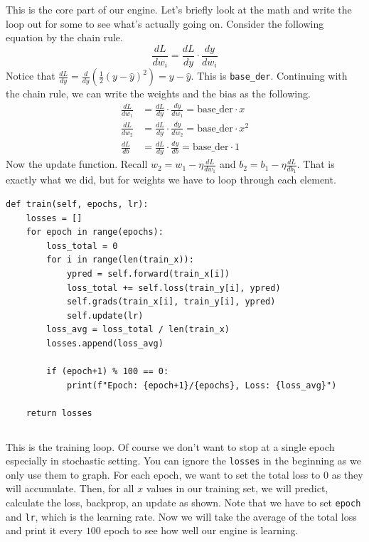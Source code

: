 \documentclass[../../main.tex]{subfiles}
\begin{document}
This is the core part of our engine. Let's briefly look at the math
and write the loop out for some to see what's actually going on.
Consider the following equation by the chain rule.
\[
\frac{dL}{dw_i} = \frac{dL}{dy} \cdot \frac{dy}{dw_i}
\]
Notice that $\frac{dL}{dy} = \frac{d}{dy} (\frac{1}{2} (y -
\hat{y})^2) = y - \hat{y}$. This is \verb|base_der|. Continuing with
the chain rule, we can write the weights and the bias as the
following.
\begin{align*}
    \frac{dL}{dw_1}
    &= \frac{dL}{dy} \cdot \frac{dy}{dw_1}
    = \text{base\_der} \cdot x \\
    \frac{dL}{dw_2}
    &= \frac{dL}{dy} \cdot \frac{dy}{dw_2}
    = \text{base\_der} \cdot x^2 \\
    \frac{dL}{db}
    &= \frac{dL}{dy} \cdot \frac{dy}{db}
    = \text{base\_der} \cdot 1
\end{align*}
Now the update function. Recall $w_2 = w_1 - \eta \frac{dL}{dw_1}$
and $b_2 = b_1 - \eta \frac{dL}{db_1}$. That is exactly what we did,
but for weights we have to loop through each element.

\begin{jupyter}
\begin{lstlisting}[style=jin]
def train(self, epochs, lr):
    losses = []
    for epoch in range(epochs):
        loss_total = 0
        for i in range(len(train_x)):
            ypred = self.forward(train_x[i])
            loss_total += self.loss(train_y[i], ypred)
            self.grads(train_x[i], train_y[i], ypred)
            self.update(lr)
        loss_avg = loss_total / len(train_x)
        losses.append(loss_avg)

        if (epoch+1) % 100 == 0:
            print(f"Epoch: {epoch+1}/{epochs}, Loss: {loss_avg}")
        
    return losses
\end{lstlisting}
\begin{lstlisting}[style=jout]
\end{lstlisting}
\end{jupyter}

This is the training loop. Of course we don't want to stop at a
single epoch especially in stochastic setting. You can ignore
the \verb|losses| in the beginning as we only use them to graph.
For each epoch, we want to set the total loss to $0$ as they will
accumulate. Then, for all $x$ values in our training set, we will
predict, calculate the loss, backprop, an update as shown. Note
that we have to set \verb|epoch| and \verb|lr|, which is the
learning rate. Now we will take the average of the total loss and
print it every $100$ epoch to see how well our engine is learning.
\end{document}

